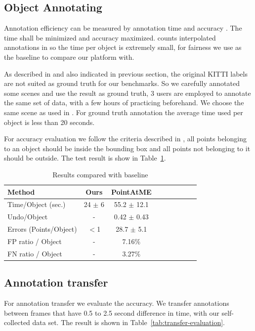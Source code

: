 \documentclass[letterpaper, 10 pt, conference]{ieeeconf}  %
\begin{document}
\subsection{Object Annotating}

Annotation efficiency can be measured by annotation time and accuracy\cite{pointatme} \cite{Zimmer20193DBA}. The time shall be minimized and accuracy maximized. \cite{Zimmer20193DBA} counts interpolated annotations in so the time per object is extremely small, for fairness we use \cite{pointatme} as the baseline to compare our platform with.

As described in \cite{pointatme} and also indicated in previous section, the original KITTI labels are not suited as ground truth for our benchmarks. So we carefully annotated some scenes and use the result as ground truth, 3 users are employed to annotate the same set of data, with a few hours of practicing beforehand. We choose the same scene as used in \cite{pointatme}. For ground truth annotation the average time used per object is less than 20 seconds.

For accuracy evaluation we follow the criteria  described in \cite{pointatme}, all points belonging to an object should be inside the bounding box and all points not belonging to it should be outside.
The test result is show in Table~\ref{tab:annotation-evaluation}.
\begin{table}[h]
	\centering
	\caption{Results compared with baseline}
	\label{tab:annotation-evaluation}
	\begin{tabular}{|l|c|c|c|c||c|c|c|c|}
		\hline
		\textbf{Method} & \textbf{Ours} & \textbf{PointAtME\cite{pointatme}} \\
		\hline
		\hline
		Time/Object (sec.) & 24 $\pm$ 6 & 55.2 $\pm$ 12.1\\
		\hline
		Undo/Object & - & 0.42 $\pm$ 0.43\\
		\hline
		Errors (Points/Object) & $<$1 & 28.7 $\pm$ 5.1\\
		\hline
		FP ratio / Object & - & 7.16\%\\
		\hline
		FN ratio / Object & - & 3.27\%\\
		\hline
	\end{tabular}
\end{table}


\subsection{Annotation transfer}
For annotation transfer we evaluate the accuracy. We  transfer annotations between frames that have 0.5 to 2.5 second difference in time, with our self-collected data set. The result is shown in Table~\ref{tab:transfer-evaluation}.
\end{document}
